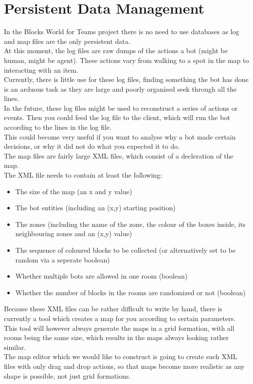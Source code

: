 \section{Persistent Data Management}
In the Blocks World for Teams project there is no need to use databases as log and map files are the only persistent data.\\

At this moment, the log files are raw dumps of the actions a bot (might be human, might be agent). These actions vary from walking to a spot in the map to interacting with an item. \\
Currently, there is little use for these log files, finding something the bot has done is an arduous task as they are large and poorly organised seek through all the lines. \\
In the future, these log files might be used to reconstruct a series of actions or events. Then you could feed the log file to the client, which will run the bot according to the lines in the log file. \\
This could become very useful if you want to analyse why a bot made certain decisions, or why it did not do what you expected it to do. \\

The map files are fairly large XML files, which consist of a decleration of the map. \\
The XML file needs to contain at least the following:
\begin{itemize}
\item The size of the map (an x and y value)
\item The bot entities (including an (x,y) starting position)
\item The zones (including the name of the zone, the colour of the boxes inside, its neighbouring zones and an (x,y) value)
\item The sequence of coloured blocks to be collected (or alternatively set to be random via a seperate boolean)
\item Whether multiple bots are allowed in one room (boolean)
\item Whether the number of blocks in the rooms are randomized or not (boolean)
\end{itemize}

Because these XML files can be rather difficult to write by hand, there is currently a tool which creates a map for you according to certain parameters. This tool will however always generate the maps in a grid formation, with all rooms being the same size, which results in the maps always looking rather similar. \\
The map editor which we would like to construct is going to create such XML files with only drag and drop actions, so that maps become more realistic as any shape is possible, not just grid formations.
